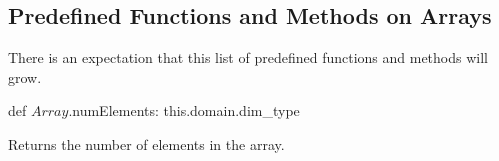 \subsection{Predefined Functions and Methods on Arrays}

There is an expectation that this list of predefined functions and
methods will grow.

\begin{protohead}
def $Array$.numElements: this.domain.dim_type
\end{protohead}
\begin{protobody}
Returns the number of elements in the array.
\end{protobody}
